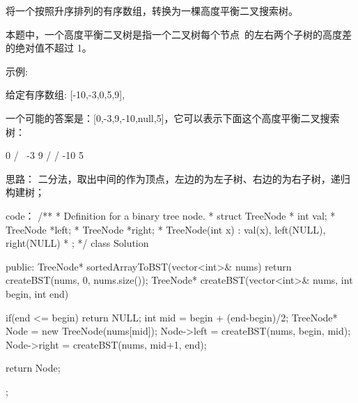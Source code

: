 将一个按照升序排列的有序数组，转换为一棵高度平衡二叉搜索树。

本题中，一个高度平衡二叉树是指一个二叉树每个节点 的左右两个子树的高度差的绝对值不超过 1。

示例:

给定有序数组: [-10,-3,0,5,9],

一个可能的答案是：[0,-3,9,-10,null,5]，它可以表示下面这个高度平衡二叉搜索树：

      0
     / \
   -3   9
   /   /
 -10  5



























思路：
二分法，取出中间的作为顶点，左边的为左子树、右边的为右子树，递归构建树；



























code：
/**
 * Definition for a binary tree node.
 * struct TreeNode {
 *     int val;
 *     TreeNode *left;
 *     TreeNode *right;
 *     TreeNode(int x) : val(x), left(NULL), right(NULL) {}
 * };
 */
class Solution {
public:
    TreeNode* sortedArrayToBST(vector<int>& nums) {
        return createBST(nums, 0, nums.size());
    }
    TreeNode* createBST(vector<int>& nums, int begin, int end)
    {
        if(end <= begin) return NULL;
        int mid = begin + (end-begin)/2;
        TreeNode* Node = new TreeNode(nums[mid]);
        Node->left = createBST(nums, begin, mid);
        Node->right = createBST(nums, mid+1, end);
        
        return Node;
    }
};